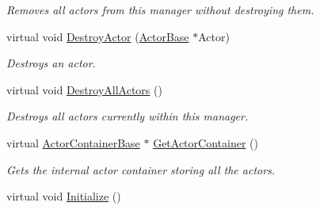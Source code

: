 \begin{DoxyCompactItemize}
\begin{DoxyCompactList}\small\item\em Removes all actors from this manager without destroying them. \item\end{DoxyCompactList}\item 
virtual void \hyperlink{classphys_1_1ActorManager_ad6770c0435aef34f359a43f4038b336b}{DestroyActor} (\hyperlink{classphys_1_1ActorBase}{ActorBase} $\ast$Actor)
\begin{DoxyCompactList}\small\item\em Destroys an actor. \item\end{DoxyCompactList}\item 
\hypertarget{classphys_1_1ActorManager_a41f436d640f344000b02978ce6a661e5}{
virtual void \hyperlink{classphys_1_1ActorManager_a41f436d640f344000b02978ce6a661e5}{DestroyAllActors} ()}
\label{classphys_1_1ActorManager_a41f436d640f344000b02978ce6a661e5}

\begin{DoxyCompactList}\small\item\em Destroys all actors currently within this manager. \item\end{DoxyCompactList}\item 
virtual \hyperlink{classphys_1_1ActorContainerBase}{ActorContainerBase} $\ast$ \hyperlink{classphys_1_1ActorManager_a7159d9d42e15d9963ee6d0989b1fd74a}{GetActorContainer} ()
\begin{DoxyCompactList}\small\item\em Gets the internal actor container storing all the actors. \item\end{DoxyCompactList}\item 
\hypertarget{classphys_1_1ActorManager_a231586ede5669da350ced7f5dcd0bee2}{
virtual void \hyperlink{classphys_1_1ActorManager_a231586ede5669da350ced7f5dcd0bee2}{Initialize} ()}
\label{classphys_1_1ActorManager_a231586ede5669da350ced7f5dcd0bee2}


\end{DoxyCompactItemize}
